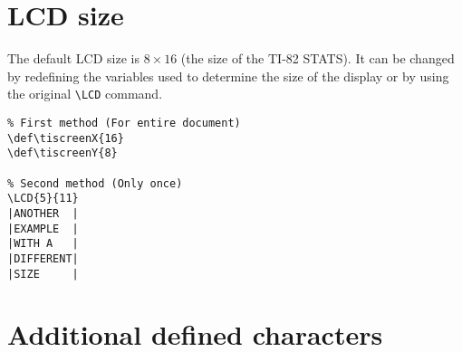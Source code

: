 \documentclass[a4paper,12pt]{article}
\newcommand{\printcmd}[1]{\texttt{\textbackslash #1}}
\begin{document}
\section{LCD size}

The default LCD size is $8 \times 16$ (the size of the TI-82 STATS). It can be
changed by redefining the variables used to determine the size of the display
or by using the original \printcmd{LCD} command.

\begin{Verbatim}
% First method (For entire document)
\def\tiscreenX{16}
\def\tiscreenY{8}

% Second method (Only once)
\LCD{5}{11}
|ANOTHER  |
|EXAMPLE  |
|WITH A   |
|DIFFERENT|
|SIZE     |
\end{Verbatim}

\section{Additional defined characters} 
\end{document}
